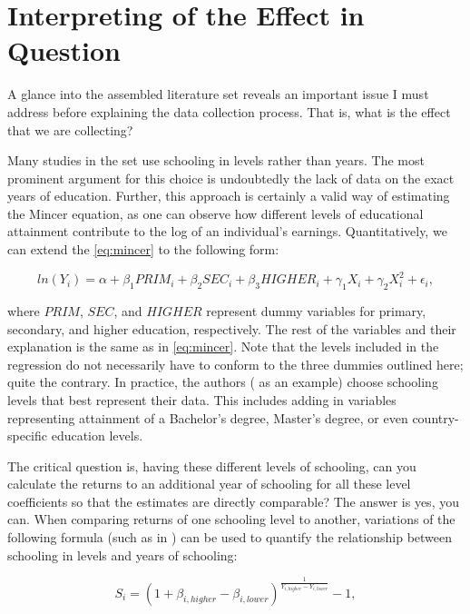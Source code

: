 \section{Interpreting of the Effect in Question}
\label{sec:effect_meaning}

A glance into the assembled literature set reveals an important issue I must address before explaining the data collection process. That is, what is the effect that we are collecting?

Many studies in the set \citep{sackey2008private, leigh2008returns, bartolj2013evolution} use schooling in levels rather than years. The most prominent argument for this choice is undoubtedly the lack of data on the exact years of education. Further, this approach is certainly a valid way of estimating the Mincer equation, as one can observe how different levels of educational attainment contribute to the log of an individual's earnings. Quantitatively, we can extend the \autoref{eq:mincer} to the following form:

\begin{equation}
    \label{eq:mincer_levels}
    ln(Y_i) = \alpha + \beta_{1}PRIM_i + \beta_{2}SEC_i + \beta_{3}HIGHER_i + \gamma_{1}X_i + \gamma_{2}X_{i}^2 + \epsilon_i,
\end{equation}

where $PRIM$, $SEC$, and $HIGHER$ represent dummy variables for primary, secondary, and higher education, respectively. The rest of the variables and their explanation is the same as in \autoref{eq:mincer}. Note that the levels included in the regression do not necessarily have to conform to the three dummies outlined here; quite the contrary. In practice, the authors (\cite{gill2000community} as an example) choose schooling levels that best represent their data. This includes adding in variables representing attainment of a Bachelor's degree, Master's degree, or even country-specific education levels.

The critical question is, having these different levels of schooling, can you calculate the returns to an additional year of schooling for all these level coefficients so that the estimates are directly comparable? The answer is yes, you can. When comparing returns of one schooling level to another, variations of the following formula (such as in \cite{agrawal2012returns}) can be used to quantify the relationship between schooling in levels and years of schooling:

\begin{equation}
\label{eq:schooling_levels}
    S_i = \left(1 + \beta_{i, higher} - \beta_{i, lower}\right)^{\frac{1}{Y_{i, higher} - Y_{i, lower}}} - 1,
\end{equation}

